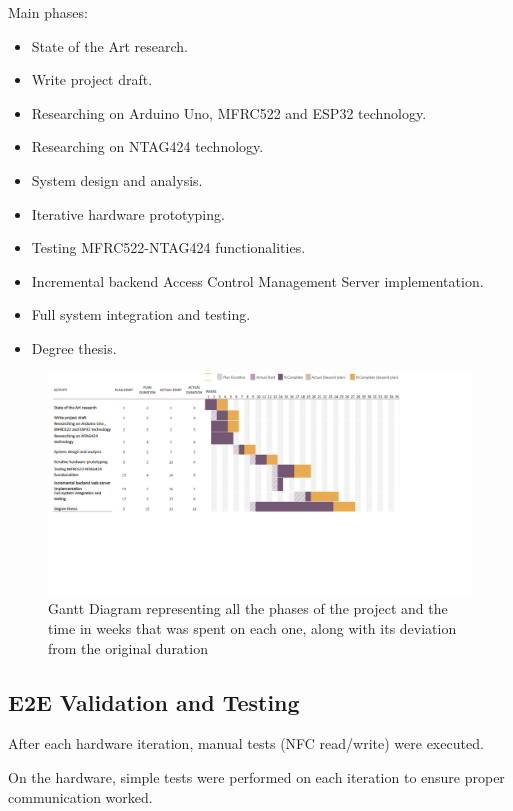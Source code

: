 Main phases:
\begin{itemize}
	\item State of the Art research.
	\item Write project draft.
	\item Researching on Arduino Uno, MFRC522 and ESP32 technology.
	\item Researching on NTAG424 technology.
	\item System design and analysis.
	\item Iterative hardware prototyping.
	\item Testing MFRC522-NTAG424 functionalities.
	\item Incremental backend Access Control Management Server implementation.
	\item Full system integration and testing.
	\item Degree thesis.
\end{itemize}


\begin{figure}[H]
	\centering
	\includegraphics[width=20cm]{imaxes/gantt1.png} %
	\caption{Gantt Diagram representing all the phases of the project and the time in weeks that was spent on each one, along with its deviation from the original duration}
	\label{fig:gantt}
\end{figure}

\subsection{E2E Validation and Testing}

After each hardware iteration, manual tests (NFC read/write) were executed.

On the hardware, simple tests were performed on each iteration to ensure proper communication worked.

